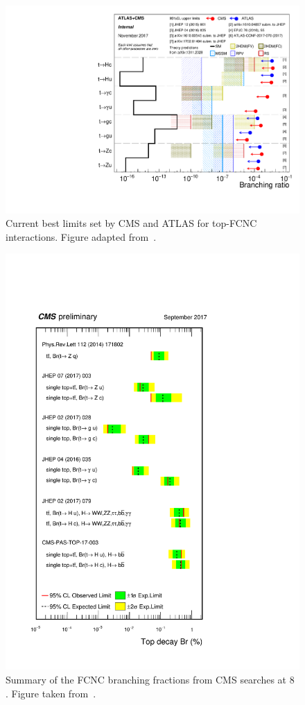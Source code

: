 \begin{figure}[htbp]
	\centering
	\includegraphics[width=1.\linewidth]{1_Introduction/Figures/fcnc_upperlimitsth.pdf}
	\caption{Current best limits set by CMS and ATLAS for top-FCNC interactions.  Figure adapted from~\cite{summarywiki}. }
	\label{fig:fcncupperlimits}
\end{figure}
\begin{figure}[htbp]
	\centering
	\includegraphics[width=0.7\linewidth]{1_Introduction/Figures/summary_FCNC.pdf}
	\caption{Summary of the FCNC branching fractions from CMS searches at 8 \TeV. Figure taken from~\cite{summarywiki}.}
	\label{fig:summaryfcnc}
\end{figure}
